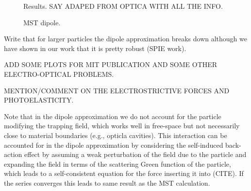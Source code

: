 \begin{figure}[tb]
    \centering
    \caption{Results. SAY ADAPED FROM OPTICA WITH ALL THE INFO.}
    \label{fig:eng_res}
\end{figure}

\begin{figure}[tb]
    \centering
    \caption{MST dipole.}
    \label{fig:MST_dipole}
\end{figure}


Write that for larger particles the dipole approximation breaks down
although we have shown in our work that it is pretty robust (SPIE work).

ADD SOME PLOTS FOR MIT PUBLICATION AND SOME OTHER ELECTRO-OPTICAL PROBLEMS.

MENTION/COMMENT ON THE ELECTROSTRICTIVE FORCES AND PHOTOELASTICITY.

Note that in the dipole approximation we do not account for the particle modifying
the trapping field, which works well in free-space but not necessarily close to material
boundaries (e.g., opticla cavities). This interaction can be accounted for in the dipole
approximation by considering the self-induced back-action effect by assuming a weak
perturbation of the field due to the particle and expanding the field in terms of 
the scattering Green function of the particle, which leads to a self-consistent
equation for the force inserting it into (CITE). If the series converges this leads 
to same result as the MST calculation. 

